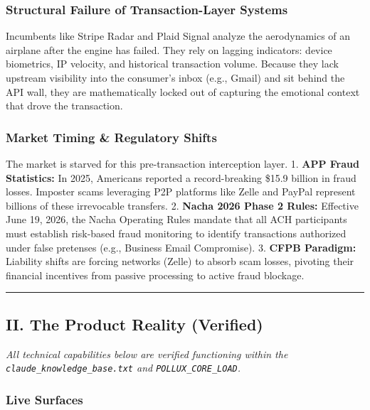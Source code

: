 \documentclass[
]{article}
\begin{document}
\subsubsection{Structural Failure of Transaction-Layer
Systems}\label{structural-failure-of-transaction-layer-systems}

Incumbents like Stripe Radar and Plaid Signal analyze the aerodynamics
of an airplane after the engine has failed. They rely on lagging
indicators: device biometrics, IP velocity, and historical transaction
volume. Because they lack upstream visibility into the consumer's inbox
(e.g., Gmail) and sit behind the API wall, they are mathematically
locked out of capturing the emotional context that drove the
transaction.

\subsubsection{Market Timing \& Regulatory
Shifts}\label{market-timing-regulatory-shifts}

The market is starved for this pre-transaction interception layer. 1.
\textbf{APP Fraud Statistics:} In 2025, Americans reported a
record-breaking \$15.9 billion in fraud losses. Imposter scams
leveraging P2P platforms like Zelle and PayPal represent billions of
these irrevocable transfers. 2. \textbf{Nacha 2026 Phase 2 Rules:}
Effective June 19, 2026, the Nacha Operating Rules mandate that all ACH
participants must establish risk-based fraud monitoring to identify
transactions authorized under false pretenses (e.g., Business Email
Compromise). 3. \textbf{CFPB Paradigm:} Liability shifts are forcing
networks (Zelle) to absorb scam losses, pivoting their financial
incentives from passive processing to active fraud blockage.

\begin{center}\rule{0.5\linewidth}{0.5pt}\end{center}

\subsection{II. The Product Reality
(Verified)}\label{ii.-the-product-reality-verified}

\emph{All technical capabilities below are verified functioning within
the \texttt{claude\_knowledge\_base.txt} and
\texttt{POLLUX\_CORE\_LOAD}.}

\subsubsection{Live Surfaces}\label{live-surfaces}
\end{document}
